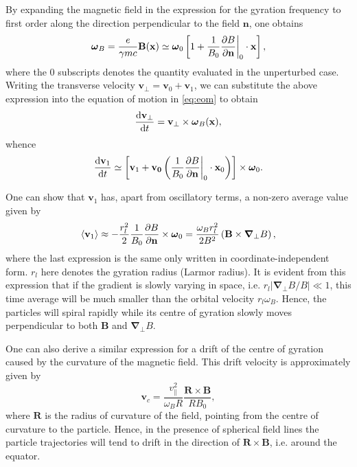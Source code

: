 
By expanding the magnetic field in the expression for the gyration frequency to first order along the direction perpendicular to the field $\mathbf{n}$, one obtains
\[
	\boldsymbol{\omega}_B = \frac{e}{\gamma m c} \mathbf{B}(\mathbf{x}) \simeq \boldsymbol{\omega}_0 \left[
	1 + \frac{1}{B_0} \frac{\partial B}{\partial \mathbf{n}}\biggr\lvert_{0} \cdot \mathbf{x} \right],
\]
where the $0$ subscripts denotes the quantity evaluated in the unperturbed case. Writing the transverse velocity $\mathbf{v}_\perp = \mathbf{v}_0 + \mathbf{v}_1$, we can substitute the above expression into the equation of motion in \ref{eq:eom} to obtain
\[
	\frac{\text{d} \mathbf{v}_\perp}{\text{d} t} = \mathbf{v}_\perp \times \boldsymbol{\omega}_B(\mathbf{x}),
\]
whence 
\[
	\frac{\text{d} \mathbf{v}_1}{\text{d} t} \simeq \left[ \mathbf{v}_1 + \mathbf{v_0} \left(\frac{1}{B_0} \frac{\partial B}{\partial \mathbf{n}}\biggr\lvert_{0} \cdot \mathbf{x}_0 \right) \right] \times \boldsymbol{\omega}_0.
\]

One can show that $\mathbf{v}_1$ has, apart from oscillatory terms, a non-zero average value given by 
\begin{equation}\label{eq:v_grad}
	\langle \mathbf{v}_1 \rangle \approx - \frac{r_l^2}{2} \frac{1}{B_0} \frac{\partial B}{\partial \mathbf{n}} \times \boldsymbol{\omega}_0 = \frac{\omega_B r_l ^2}{2 B^2} \left( \mathbf{B} \times \boldsymbol{\nabla}_\perp B\right),
\end{equation}
where the last expression is the same only written in coordinate-independent form. $r_l$ here denotes the gyration radius (Larmor radius). It is evident from this expression that if the gradient is slowly varying in space, i.e. $r_l \vert \boldsymbol{\nabla}_\perp B / B \vert \ll 1$, this time average will be much smaller than the orbital velocity $r_l \omega_B$. Hence, the particles will spiral rapidly while its centre of gyration slowly moves perpendicular to both $\mathbf{B}$ and $\boldsymbol{\nabla}_\perp B$. 

One can also derive a similar expression for a drift of the centre of gyration caused by the curvature of the magnetic field. This drift velocity is approximately given by
\begin{equation}\label{eq:v_curv}
	\mathbf{v}_c = \frac{v_{\parallel}^2}{\omega_B R} \frac{\mathbf{R} \times \mathbf{B}}{R B_0},
\end{equation}
where $\mathbf{R}$ is the radius of curvature of the field, pointing from the centre of curvature to the particle. Hence, in the presence of spherical field lines the particle trajectories will tend to drift in the direction of $\mathbf{R} \times \mathbf{B}$, i.e. around the equator. 

